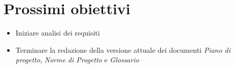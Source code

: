 \section{Prossimi obiettivi}
   \begin{itemize}
        \item Iniziare analisi dei requisiti
        \item Terminare la redazione della versione attuale dei documenti \textit{Piano di progetto}, \textit{Norme di Progetto} e \textit{Glossario}
    \end{itemize}
